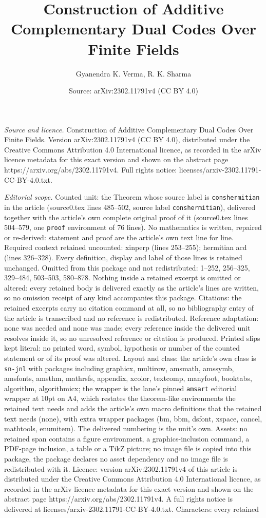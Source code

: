 \documentclass[10pt,a4paper]{amsart}
\title[Construction of Additive Complementary Dual Codes Over Finit]{Construction of Additive Complementary Dual Codes Over Finite Fields}
\author{Gyanendra K. Verma, R. K. Sharma}
\date{Source: arXiv:2302.11791v4 (CC BY 4.0)}
\begin{document}
\maketitle

\noindent\emph{Source and licence.} Construction of Additive Complementary Dual Codes Over Finite Fields. Version arXiv:2302.11791v4 (CC BY 4.0), distributed under the Creative Commons Attribution 4.0 International licence, as recorded in the arXiv licence metadata for this exact version and shown on the abstract page https://arxiv.org/abs/2302.11791v4. Full rights notice: licenses/arxiv-2302.11791-CC-BY-4.0.txt.\par\smallskip

\noindent\textit{Editorial scope.} Counted unit: the Theorem whose source label is \texttt{conshermitian} in the article (source0.tex lines 485--502, source label \texttt{conshermitian}), delivered together with the article's own complete original proof of it (source0.tex lines 504--579, one \texttt{proof} environment of 76 lines). No mathematics is written, repaired or re-derived: statement and proof are the article's own text line for line. Required context retained uncounted: xinperp (lines 253--255); hermitian acd (lines 326--328). Every definition, display and label of those lines is retained unchanged. Omitted from this package and not redistributed: 1--252, 256--325, 329--484, 503--503, 580--878. Nothing inside a retained excerpt is omitted or altered: every retained body is delivered exactly as the article's lines are written, so no omission receipt of any kind accompanies this package. Citations: the retained excerpts carry no citation command at all, so no bibliography entry of the article is transcribed and no reference is redistributed. Reference adaptation: none was needed and none was made; every reference inside the delivered unit resolves inside it, so no unresolved reference or citation is produced. Printed slips kept literal: no printed word, symbol, hypothesis or number of the counted statement or of its proof was altered. Layout and class: the article's own class is \texttt{sn-jnl} with packages including graphicx, multirow, amsmath, amssymb, amsfonts, amsthm, mathrsfs, appendix, xcolor, textcomp, manyfoot, booktabs, algorithm, algorithmicx; the wrapper is the lane's pinned \texttt{amsart} editorial wrapper at 10pt on A4, which restates the theorem-like environments the retained text needs and adds the article's own macro definitions that the retained text needs (none), with extra wrapper packages (bm, bbm, dsfont, xspace, cancel, mathtools, enumitem). The delivered numbering is the unit's own. Assets: no retained span contains a figure environment, a graphics-inclusion command, a PDF-page inclusion, a table or a TikZ picture; no image file is copied into this package, the package declares no asset dependency and no image file is redistributed with it. Licence: version arXiv:2302.11791v4 of this article is distributed under the Creative Commons Attribution 4.0 International licence, as recorded in the arXiv licence metadata for this exact version and shown on the abstract page https://arxiv.org/abs/2302.11791v4. A full rights notice is delivered at licenses/arxiv-2302.11791-CC-BY-4.0.txt. Characters: every retained 
\end{document}
